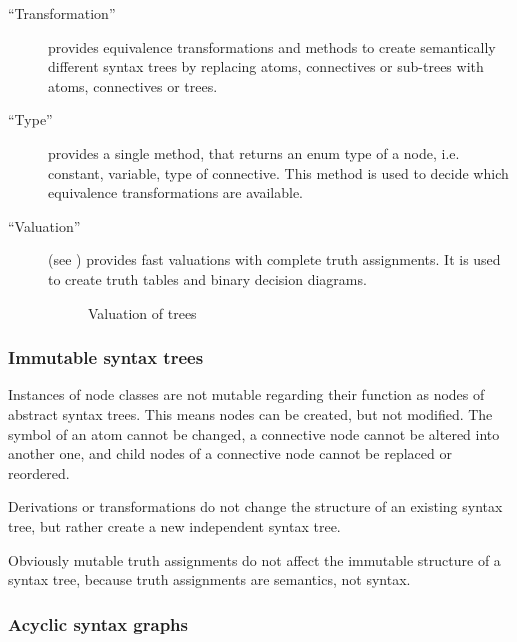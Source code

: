 \begin{description}
\item[“Transformation”]\label{item:TRANSFORMATIONS} provides equivalence transformations 
and methods to create 
 semantically different syntax trees by replacing atoms, connectives or sub-trees with
atoms, connectives or trees.

\item[“Type”] provides a single method, 
that returns an enum type of a node, i.e. constant, variable, type of connective. 
This method is used to decide which equivalence transformations are available.

\item[“Valuation”] (see ) 
provides fast valuations with complete truth assignments. 
It is used to create truth tables and binary decision diagrams. 

\begin{figure}[htbp]
\begin{center}
\caption{Valuation of trees}
\label{fig:NyayaNodeValuation}
\end{center}
\end{figure}

\end{description}
\subsubsection{Immutable syntax trees}

Instances of node classes are not mutable 
regarding their function as nodes of abstract syntax trees. 
This means nodes can be created, but not modified.
The symbol of an atom cannot be changed, 
a connective node cannot be altered into another one,
and child nodes of a connective node cannot be replaced or reordered.

Derivations or transformations do not change the structure of an existing syntax tree,
but rather create a new independent syntax tree.

Obviously mutable truth assignments do not affect the immutable structure of a syntax tree,
because truth assignments are semantics, not syntax. 

\subsubsection{Acyclic syntax graphs}

